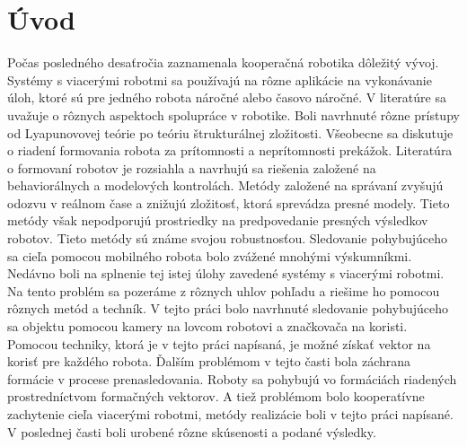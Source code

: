 
\section*{Úvod}
\setcounter{page}{1}
Počas posledného desaťročia zaznamenala kooperačná robotika dôležitý vývoj. Systémy s viacerými robotmi sa používajú na rôzne aplikácie na vykonávanie úloh, ktoré sú pre jedného robota náročné alebo časovo náročné. V literatúre sa uvažuje o rôznych aspektoch spolupráce v robotike. Boli navrhnuté rôzne prístupy od Lyapunovovej teórie po teóriu štrukturálnej zložitosti.
Všeobecne sa diskutuje o riadení formovania robota za prítomnosti a neprítomnosti prekážok. Literatúra o formovaní robotov je rozsiahla a navrhujú sa riešenia založené na behaviorálnych a modelových kontrolách. Metódy založené na správaní zvyšujú odozvu v reálnom čase a znižujú zložitosť, ktorá sprevádza presné modely. Tieto metódy však nepodporujú prostriedky na predpovedanie presných výsledkov robotov. Tieto metódy sú známe svojou robustnosťou. 
Sledovanie pohybujúceho sa cieľa pomocou mobilného robota bolo zvážené mnohými výskumníkmi. Nedávno boli na splnenie tej istej úlohy zavedené systémy s viacerými robotmi. Na tento problém sa pozeráme z rôznych uhlov pohľadu a riešime ho pomocou rôznych metód a techník.
V tejto práci bolo navrhnuté sledovanie pohybujúceho sa objektu pomocou kamery na lovcom robotovi a značkovača na koristi. Pomocou techniky, ktorá je v tejto práci napísaná, je možné získať vektor na korisť pre každého robota. Ďalším problémom v tejto časti bola záchrana formácie v procese prenasledovania. Roboty sa pohybujú vo formáciách riadených prostredníctvom formačných vektorov.  A tiež problémom bolo kooperatívne zachytenie cieľa viacerými robotmi, metódy realizácie boli v tejto práci napísané. V poslednej časti boli urobené rôzne skúsenosti a podané výsledky.